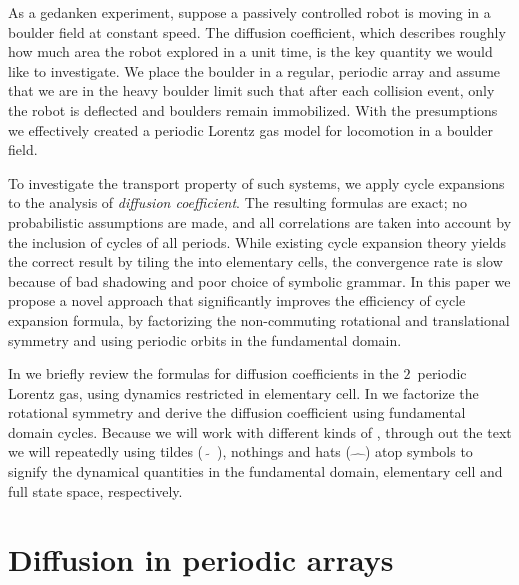 \documentclass[aps,pre,
                showpacs,
                twocolumn,
                groupedaddress,
                floatfix]{revtex4-1}
\begin{document}
As a gedanken experiment, suppose a passively controlled robot is moving in a boulder field at constant speed. The diffusion coefficient, which describes roughly how much area the robot explored in a unit time, is the key quantity we would like to investigate. We place the boulder in a regular, periodic array and assume that we are in the heavy boulder limit such that after each collision event, only the robot is deflected and boulders remain immobilized. With the presumptions we effectively created a periodic Lorentz gas model for locomotion in a boulder field.

To investigate the transport property of such systems, we apply cycle expansions to the analysis of {\em diffusion coefficient}. The resulting formulas are exact; no probabilistic assumptions are made, and all correlations are taken into account by the  inclusion of cycles of all periods. While existing cycle expansion theory yields the correct result by tiling the {\statesp} into elementary cells, the convergence rate is slow because of bad shadowing and poor choice of symbolic grammar. In this paper we propose a novel approach that significantly improves the efficiency of cycle expansion formula, by factorizing the non-commuting rotational and translational symmetry and using periodic orbits in the fundamental domain. 


In  we briefly review the formulas for diffusion coefficients in the $2$\dmn\ periodic Lorentz gas, using dynamics restricted in elementary cell. In we factorize the rotational symmetry and derive the diffusion coefficient using fundamental domain cycles. Because we will work with different kinds of \statesp, through out the text we will repeatedly using tildes ($\tilde{\quad}$), nothings and hats ($\hat{\quad}$) atop symbols to signify the dynamical quantities in the fundamental domain, elementary cell and full state space, respectively.

\section{Diffusion in periodic arrays}
\label{s-DiffPerArr}
\end{document}
